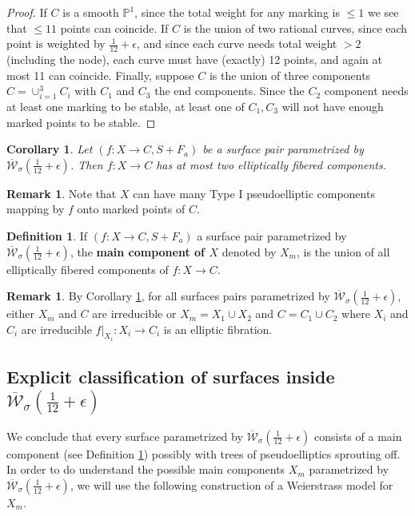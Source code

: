 \documentclass[11pt]{amsart}
\newtheorem{cor}[theorem]{Corollary}
\theoremstyle{definition}
\newtheorem{definition}[theorem]{Definition}
\newtheorem{remark}[theorem]{Remark}
\theoremstyle{remark}
\newcommand{\bP}{{\mathbb P}}
\newcommand{\calW}{\mathcal W}
\newcommand{\ktwelve}{\overline{\calW}_\sigma({\frac{1}{12}+\epsilon})}
\begin{document}
	\begin{proof} If $C$ is a smooth $\bP^1$, since the total weight for any marking is $\leq 1$ we see that $\leq 11$ points can coincide.   If $C$ is the union of two rational curves, since each point is weighted by $\frac{1}{12}+ \epsilon$, and since each curve needs total weight $>2$ (including the node), each curve must have (exactly) 12 points, and again at most 11 can coincide. Finally, suppose $C$ is the union of three components $C = \cup_{i =1}^3 C_i$ with $C_1$ and $C_3$ the end components. Since the $C_2$ component needs at least one marking to be stable, at least one of $C_1, C_3$ will not have enough marked points to be stable. 
	\end{proof}
	
	
	
	\begin{cor}\label{cor:twocomponents} Let $(f : X \to C, S + F_a)$ be a surface pair parametrized by $\ktwelve$. Then $f : X \to C$ has at most two elliptically fibered components. \end{cor}
	
	\begin{remark} Note that  $X$ can have many Type I pseudoelliptic components mapping by $f$ onto marked points of $C$. \end{remark}
	
	\begin{definition}\label{def:maincomponent} If $(f : X \to C, S + F_a)$ a surface pair parametrized by $\ktwelve$, the \textbf{main component of $X$} denoted by $X_m$, is the union of all elliptically fibered components of $f : X \to C$. 
	\end{definition} 
	
	\begin{remark} \label{rem:maincomponent} By Corollary \ref{cor:twocomponents}, for all surfaces pairs parametrized by $\ktwelve$, either $X_m$ and $C$ are irreducible or $X_m = X_1 \cup X_2$ and $C = C_1 \cup C_2$ where $X_i$ and $C_i$ are irreducible $f|_{X_i} : X_i \to C_i$ is an elliptic fibration.  
	\end{remark} 
	
	
	\subsection{Explicit classification of surfaces inside $\ktwelve$}\label{sec:explicitktwelve}
	
	We conclude that every surface parametrized by $\ktwelve$ consists of a main component (see Definition \ref{def:maincomponent}) possibly with trees of pseudoelliptics sprouting off. In order to do understand the possible main components $X_m$ parametrized by $\ktwelve$, we will use the following construction of a Weierstrass model for $X_m$. 
	
\end{document}
